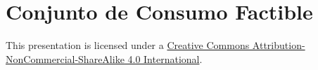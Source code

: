 \documentclass[10pt,aspectratio=169]{beamer}  %
\begin{document}
  \section{Conjunto de Consumo Factible}




{
\begin{frame}[standout]
	This presentation is licensed under a
	\href{https://creativecommons.org/licenses/by-nc-sa/4.0/}{Creative Commons Attribution-NonCommercial-ShareAlike 4.0 International}.
	
	\begin{center}
		\ccbyncsa
	\end{center}
\end{frame}
}
\end{document}

